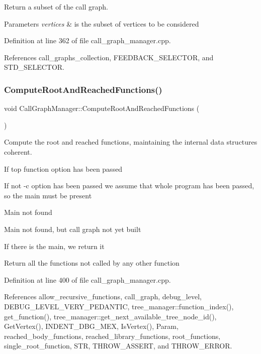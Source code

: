 Return a subset of the call graph. 


\begin{DoxyParams}{Parameters}
{\em vertices} & is the subset of vertices to be considered \\
\hline
\end{DoxyParams}


Definition at line 362 of file call\+\_\+graph\+\_\+manager.\+cpp.



References call\+\_\+graphs\+\_\+collection, F\+E\+E\+D\+B\+A\+C\+K\+\_\+\+S\+E\+L\+E\+C\+T\+OR, and S\+T\+D\+\_\+\+S\+E\+L\+E\+C\+T\+OR.

\mbox{\label{classCallGraphManager_abcbe2ee2364242c09a811a07139f10fb}} 
\subsubsection{\texorpdfstring{Compute\+Root\+And\+Reached\+Functions()}{ComputeRootAndReachedFunctions()}}
{\footnotesize\ttfamily void Call\+Graph\+Manager\+::\+Compute\+Root\+And\+Reached\+Functions (\begin{DoxyParamCaption}{ }\end{DoxyParamCaption})\hspace{0.3cm}{\ttfamily [private]}}



Compute the root and reached functions, maintaining the internal data structures coherent. 

If top function option has been passed

If not -\/c option has been passed we assume that whole program has been passed, so the main must be present

Main not found

Main not found, but call graph not yet built

If there is the main, we return it

Return all the functions not called by any other function 

Definition at line 400 of file call\+\_\+graph\+\_\+manager.\+cpp.



References allow\+\_\+recursive\+\_\+functions, call\+\_\+graph, debug\+\_\+level, D\+E\+B\+U\+G\+\_\+\+L\+E\+V\+E\+L\+\_\+\+V\+E\+R\+Y\+\_\+\+P\+E\+D\+A\+N\+T\+IC, tree\+\_\+manager\+::function\+\_\+index(), get\+\_\+function(), tree\+\_\+manager\+::get\+\_\+next\+\_\+available\+\_\+tree\+\_\+node\+\_\+id(), Get\+Vertex(), I\+N\+D\+E\+N\+T\+\_\+\+D\+B\+G\+\_\+\+M\+EX, Is\+Vertex(), Param, reached\+\_\+body\+\_\+functions, reached\+\_\+library\+\_\+functions, root\+\_\+functions, single\+\_\+root\+\_\+function, S\+TR, T\+H\+R\+O\+W\+\_\+\+A\+S\+S\+E\+RT, and T\+H\+R\+O\+W\+\_\+\+E\+R\+R\+OR.



